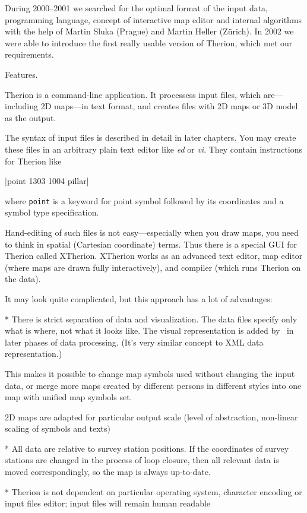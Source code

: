 During 2000--2001 we searched for the optimal format of the input data, programming 
language, concept of interactive map editor and internal algorithms with the 
help of Martin Sluka (Prague) and Martin Heller (Z\"urich). In 2002 we were able to 
introduce the first really usable version of Therion, which met our requirements.


\subchapter Features.

Therion is a command-line application. It processess input files, which 
are---including 2D maps---in text format, and creates files with 2D maps or 
3D model as the output.

The syntax of input files is described in detail in later chapters. 
You may create these files in an arbitrary plain text editor like 
{\it ed} or {\it vi}. They contain instructions for Therion like 

|point 1303 1004 pillar| 

where {\tt point} is a keyword for point symbol 
followed by its coordinates and a symbol type specification.

Hand-editing of such files is not easy---especially when you draw maps, you 
need to think in spatial (Cartesian coordinate) terms. Thus there is a special 
GUI for Therion called XTherion. XTherion works as an advanced text editor, map 
editor (where maps are drawn fully interactively), and compiler (which runs
Therion on the data).

It may look quite complicated, but this approach has a lot of advantages:

\list
* There is strict separation of data and visualization. The data files specify 
  only what is where, not what it looks like. The visual representation 
  is added by \MP\ in later phases of data processing. (It's very 
  similar concept to XML data representation.) 
  
  This makes it possible to change map symbols used without changing the 
  input data, or merge more maps created by different persons in different 
  styles into one map with unified map symbols set.

  2D maps are adapted for particular output scale (level of abstraction,
  non-linear scaling of symbols and texts)
  
* All data are relative to survey station positions. If the coordinates
  of survey stations are changed in the process of loop closure, then all relevant
  data is moved correspondingly, so the map is always up-to-date.

* Therion is not dependent on particular operating system, character encoding
  or input files editor; input files will remain human readable


